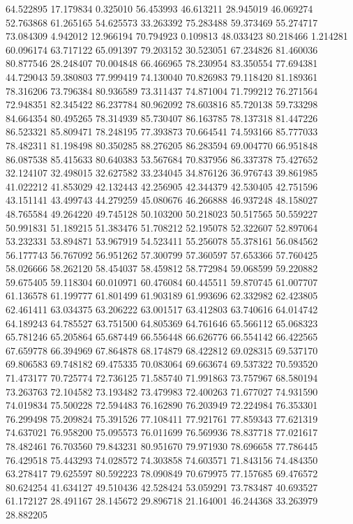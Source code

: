 64.522895
17.179834
0.325010
56.453993
46.613211
28.945019
46.069274
52.763868
61.265165
54.625573
33.263392
75.283488
59.373469
55.274717
73.084309
4.942012
12.966194
70.794923
0.109813
48.033423
80.218466
1.214281
60.096174
63.717122
65.091397
79.203152
30.523051
67.234826
81.460036
80.877546
28.248407
70.004848
66.466965
78.230954
83.350554
77.694381
44.729043
59.380803
77.999419
74.130040
70.826983
79.118420
81.189361
78.316206
73.796384
80.936589
73.311437
74.871004
71.799212
76.271564
72.948351
82.345422
86.237784
80.962092
78.603816
85.720138
59.733298
84.664354
80.495265
78.314939
85.730407
86.163785
78.137318
81.447226
86.523321
85.809471
78.248195
77.393873
70.664541
74.593166
85.777033
78.482311
81.198498
80.350285
88.276205
86.283594
69.004770
66.951848
86.087538
85.415633
80.640383
53.567684
70.837956
86.337378
75.427652
32.124107
32.498015
32.627582
33.234045
34.876126
36.976743
39.861985
41.022212
41.853029
42.132443
42.256905
42.344379
42.530405
42.751596
43.151141
43.499743
44.279259
45.080676
46.266888
46.937248
48.158027
48.765584
49.264220
49.745128
50.103200
50.218023
50.517565
50.559227
50.991831
51.189215
51.383476
51.708212
52.195078
52.322607
52.897064
53.232331
53.894871
53.967919
54.523411
55.256078
55.378161
56.084562
56.177743
56.767092
56.951262
57.300799
57.360597
57.653366
57.760425
58.026666
58.262120
58.454037
58.459812
58.772984
59.068599
59.220882
59.675405
59.118304
60.010971
60.476084
60.445511
59.870745
61.007707
61.136578
61.199777
61.801499
61.903189
61.993696
62.332982
62.423805
62.461411
63.034375
63.206222
63.001517
63.412803
63.740616
64.014742
64.189243
64.785527
63.751500
64.805369
64.761646
65.566112
65.068323
65.781246
65.205864
65.687449
66.556448
66.626776
66.554142
66.422565
67.659778
66.394969
67.864878
68.174879
68.422812
69.028315
69.537170
69.806583
69.748182
69.475335
70.083064
69.663674
69.537322
70.593520
71.473177
70.725774
72.736125
71.585740
71.991863
73.757967
68.580194
73.263763
72.104582
73.193482
73.479983
72.400263
71.677027
74.931590
74.019834
75.500228
72.594483
76.162890
76.203949
72.224984
76.353301
76.299498
75.209824
75.391526
77.108411
77.921761
77.859343
77.621319
74.637021
76.958200
75.095573
76.011699
76.569936
78.837718
77.021617
78.482461
76.703560
79.843231
80.951670
79.971930
78.696658
77.786445
76.429518
75.443293
74.028572
74.303858
74.603571
71.843156
74.484350
63.278417
79.625597
80.592223
78.090849
70.679975
77.157685
69.476572
80.624254
41.634127
49.510436
42.528424
53.059291
73.783487
40.693527
61.172127
28.491167
28.145672
29.896718
21.164001
46.244368
33.263979
28.882205
